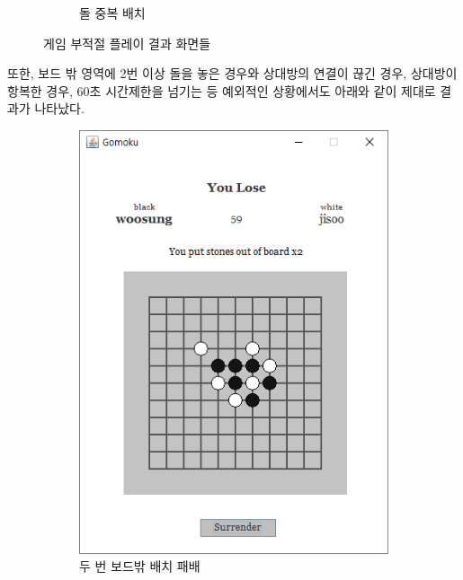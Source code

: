 \documentclass[a4paper, 10pt]{article}
\begin{document}
\begin{figure}[h]
\begin{subfigure}{.3\textwidth}
    \caption{돌 중복 배치}
    \label{fig:draw}
  \end{subfigure}
  \caption{게임 부적절 플레이 결과 화면들}
\end{figure}

또한, 보드 밖 영역에 2번 이상 돌을 놓은 경우와 상대방의 연결이 끊긴 경우, 상대방이 항복한
경우, 60초 시간제한을 넘기는 등 예외적인 상황에서도 아래와 같이 제대로 결과가 나타났다.
\begin{figure}[h]
  \centering
  \begin{subfigure}{.24\textwidth}
    \centering
    \includegraphics[width=.9\linewidth]{resource/out_of_board2}
    \caption{두 번 보드밖 배치 패배}
    \label{fig:out_of_board2}
  \end{subfigure}
  \begin{subfigure}{.24\textwidth}
    \centering

\end{subfigure}
\end{figure}
\end{document}
